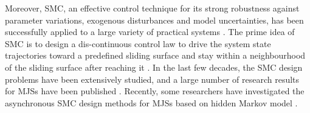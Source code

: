 \documentclass[journal,final,twocolumn]{IEEEtran}
\begin{document}
	
	Moreover, SMC, an effective control technique for its strong robustness against parameter variations,  exogenous disturbances and model uncertainties, has been successfully applied to a large variety of practical systems \cite{utkin2009sliding,yang1999sliding,shima2006sliding}.  The prime idea of SMC is to design a dis-continuous control law to drive the system state trajectories toward a predefined sliding surface and stay within a neighbourhood of the  sliding surface after reaching it \cite{edwards1998sliding}. In the last few decades, the SMC design problems have been extensively studied, and a large number of  research results for MJSs have been published \cite{li2015state,wu2010state,wang2017smc}. Recently, some researchers have investigated the asynchronous SMC design methods for MJSs based on hidden Markov model \cite{song2018asynchronous,li2017passivity,qi2018observer}. 
	
	
	
\end{document}
